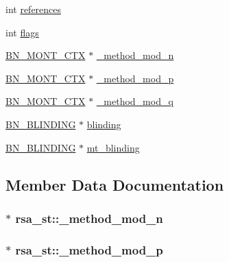 \begin{DoxyCompactItemize}
\item 
int \hyperlink{structrsa__st_a3b8d372e797fd47606f57789f1c98df9}{references}
\item 
int \hyperlink{structrsa__st_abf88fc039269dcd478fd4436d4b332ae}{flags}
\item 
\hyperlink{ossl__typ_8h_aec902d353e00ced6d3fee6cd033a8bd0}{B\+N\+\_\+\+M\+O\+N\+T\+\_\+\+C\+TX} $\ast$ \hyperlink{structrsa__st_a3942c90b1f0b16266528f88d14adc6ca}{\+\_\+method\+\_\+mod\+\_\+n}
\item 
\hyperlink{ossl__typ_8h_aec902d353e00ced6d3fee6cd033a8bd0}{B\+N\+\_\+\+M\+O\+N\+T\+\_\+\+C\+TX} $\ast$ \hyperlink{structrsa__st_a468edd0a44ae2aefed076f99f8714ffd}{\+\_\+method\+\_\+mod\+\_\+p}
\item 
\hyperlink{ossl__typ_8h_aec902d353e00ced6d3fee6cd033a8bd0}{B\+N\+\_\+\+M\+O\+N\+T\+\_\+\+C\+TX} $\ast$ \hyperlink{structrsa__st_a463b97b59664b66f0e29881c915a1489}{\+\_\+method\+\_\+mod\+\_\+q}
\item 
\hyperlink{ossl__typ_8h_a38325fe1e4071c8c097396804df843bb}{B\+N\+\_\+\+B\+L\+I\+N\+D\+I\+NG} $\ast$ \hyperlink{structrsa__st_a953fd4cc8742674450f7a17841c5bcd5}{blinding}
\item 
\hyperlink{ossl__typ_8h_a38325fe1e4071c8c097396804df843bb}{B\+N\+\_\+\+B\+L\+I\+N\+D\+I\+NG} $\ast$ \hyperlink{structrsa__st_a7e167b57f2c8af705b7519cc22458cba}{mt\+\_\+blinding}
\end{DoxyCompactItemize}


\subsection{Member Data Documentation}
\subsubsection[{\texorpdfstring{\+\_\+method\+\_\+mod\+\_\+n}{_method_mod_n}}]{$\ast$ rsa\+\_\+st\+::\+\_\+method\+\_\+mod\+\_\+n}\hypertarget{structrsa__st_a3942c90b1f0b16266528f88d14adc6ca}{}\label{structrsa__st_a3942c90b1f0b16266528f88d14adc6ca}
\subsubsection[{\texorpdfstring{\+\_\+method\+\_\+mod\+\_\+p}{_method_mod_p}}]{$\ast$ rsa\+\_\+st\+::\+\_\+method\+\_\+mod\+\_\+p}\hypertarget{structrsa__st_a468edd0a44ae2aefed076f99f8714ffd}{}\label{structrsa__st_a468edd0a44ae2aefed076f99f8714ffd}
